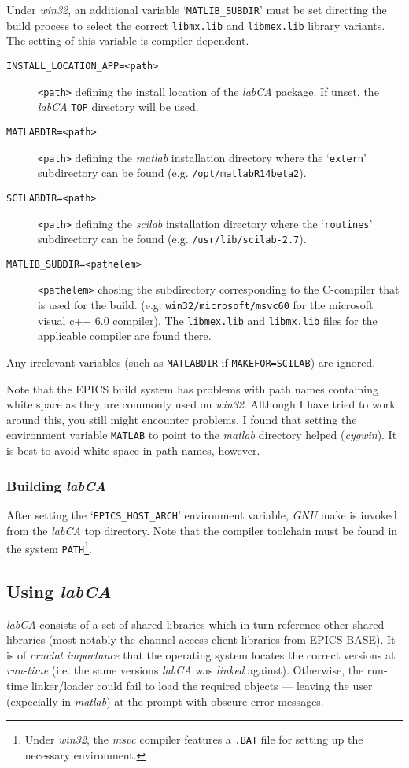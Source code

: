 \documentclass{article}
\newcommand{\sca}{\ita{labCA}}
\newcommand{\scilab}{\ita{scilab}}
\newcommand{\matlab}{\ita{matlab}}
\newcommand{\windoze}{\ita{win32}}
\newcommand{\com}[1]{{\tt #1}}
\newcommand{\pbrk}{\pagebreak[3]}
\newcommand{\ita}[1]{\emph{#1}}
\renewcommand{\pbrk}{}
\begin{document}
\begin{description}
Under \windoze{}, an additional variable
`\com{MATLIB\_SUBDIR}' must be set directing the build process to select the correct
\com{libmx.lib} and \com{libmex.lib} library variants. The setting of this variable
is compiler dependent.
\begin{description}
\item[\tt INSTALL\_LOCATION\_APP=<path>] \com{<path>} defining the
install location of the \sca{} package. If unset, the \sca{} \com{TOP}
directory will be used.
\item[\tt MATLABDIR=<path>] \com{<path>} defining the \matlab{} installation
directory where the `\com{extern}' subdirectory can be found (e.g.
\com{/opt/matlabR14beta2}).
\item[\tt SCILABDIR=<path>] \com{<path>} defining the \scilab{} installation
directory where the `\com{routines}' subdirectory can be found (e.g.
\com{/usr/lib/scilab-2.7}).
\item[\tt MATLIB\_SUBDIR=<pathelem>] \com{<pathelem>} chosing the subdirectory
corresponding to the C-compiler that is used for the build. (e.g. 
\com{win32/microsoft/msvc60} for the microsoft visual c++ 6.0 compiler).
The \com{libmex.lib} and \com{libmx.lib} files for the applicable compiler
are found there.
\end{description}
\end{description}
Any irrelevant variables (such as \com{MATLABDIR} if \com{MAKEFOR=SCILAB})
are ignored.

Note that the EPICS build system has problems with path names containing
white space as they are commonly used on \windoze. Although I have
tried to work around this, you still might encounter problems. I found
that setting the environment variable \com{MATLAB} to point to the \matlab{}
directory helped (\ita{cygwin}). It is best to avoid white space in path
names, however.

\subsubsection{Building \sca}
After setting the
`\com{EPICS\_HOST\_ARCH}' environment variable, \ita{GNU} make is invoked from the \sca{} top 
directory. Note that the compiler toolchain must be found in the system
\com{PATH}\footnote{
Under \windoze, the \ita{msvc} compiler features a \com{.BAT} file for
setting up the necessary environment.
}.

\pbrk
\subsection{Using \sca{}}
\label{usingsca}
\sca{} consists of a set of shared libraries which in turn reference
other shared libraries (most notably the channel access client libraries
from EPICS BASE). It is of \ita{crucial importance} that the operating
system locates the correct versions at \ita{run-time} (i.e. the same versions
\sca{} was \ita{linked} against). Otherwise, the run-time linker/loader
could fail to load the required objects --- leaving the user (expecially
in \matlab) at the prompt with obscure error messages.
\end{document}
